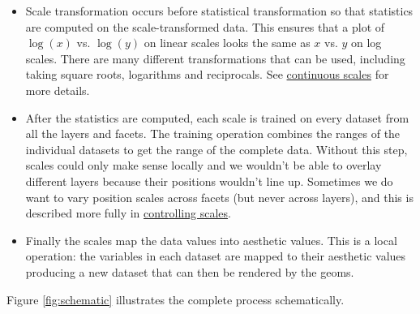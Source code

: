 \begin{itemize}
\item
  Scale transformation occurs before statistical transformation so that
  statistics are computed on the scale-transformed data. This ensures
  that a plot of \(\log(x)\) vs. \(\log(y)\) on linear scales looks the
  same as \(x\) vs. \(y\) on log scales. There are many different
  transformations that can be used, including taking square roots,
  logarithms and reciprocals. See
  \hyperref[ssub:scale-continuous]{continuous scales} for more details.
\item
  After the statistics are computed, each scale is trained on every
  dataset from all the layers and facets. The training operation
  combines the ranges of the individual datasets to get the range of the
  complete data. Without this step, scales could only make sense locally
  and we wouldn't be able to overlay different layers because their
  positions wouldn't line up. Sometimes we do want to vary position
  scales across facets (but never across layers), and this is described
  more fully in \hyperref[sub:controlling-scales]{controlling scales}.
\item
  Finally the scales map the data values into aesthetic values. This is
  a local operation: the variables in each dataset are mapped to their
  aesthetic values producing a new dataset that can then be rendered by
  the geoms.
\end{itemize}

Figure \ref{fig:schematic} illustrates the complete process
schematically.

